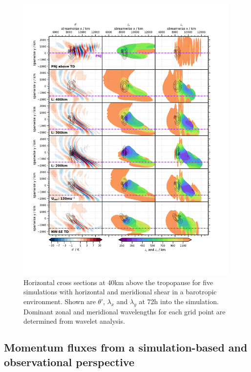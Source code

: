 \begin{figure}[]
    \centering
    \includegraphics[width=0.99\textwidth]{figures_3D/waveletAna_dudy.png}
    \caption{Horizontal cross sections at 40km above the tropopause for five simulations with horizontal and meridional shear in a barotropic environment. Shown are $\theta$', $\lambda_x$ and $\lambda_y$ at 72h into the simulation. Dominant zonal and meridional wavelengths for each grid point are determined from wavelet analysis.}
    \label{fig:waveletAna_dudy}
\end{figure}


\subsection{Momentum fluxes from a simulation-based and observational perspective}

